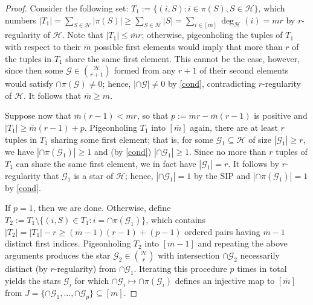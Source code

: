 \documentclass[journal, twocolumn]{IEEEtran}
\begin{document}
\begin{proof}
Consider the following set: $T_1 := \{(i, S): i \in \pi(S), S \in \mathcal{H}\}$, which numbers $|T_1| = \sum_{S \in \mathcal{H}} |\pi(S)| \geq \sum_{S \in \mathcal{H}} |S| = \sum_{i \in [m]} \deg_\mathcal{H}(i) = mr$ by $r$-regularity of $\mathcal{H}$. Note that $|T_1| \leq \overline m r$; otherwise, pigeonholing the tuples of $T_1$ with respect to their $\overline m$ possible first elements would imply that more than $r$ of the tuples in $T_1$ share the same first element. This cannot be the case, however, since then some $\mathcal{G} \in {\mathcal{H} \choose r+1}$ formed from any $r+1$ of their second elements would satisfy $\cap \pi(\mathcal{G}) \neq 0$; hence, $|\cap \mathcal{G}| \neq 0$ by \eqref{cond}, contradicting $r$-regularity of $\mathcal{H}$. It follows that $\overline m \geq m$.

Suppose now that $\overline m (r-1) < mr$, so that $p := mr - \overline m (r-1)$ is positive and $|T_1| \geq \overline m (r - 1) + p$. Pigeonholing $T_1$ into $[\overline m]$ again, there are at least $r$ tuples in $T_1$ sharing some first element; that is, for some $\mathcal{G}_1 \subseteq \mathcal{H}$ of size $|\mathcal{G}_1| \geq r$, we have $|\cap \pi(\mathcal{G}_1)| \geq 1$ and (by \eqref{cond}) $|\cap \mathcal{G}_1| \geq 1$. Since no more than $r$ tuples of $T_1$ can share the same first element, we in fact have $|\mathcal{G}_1| = r$. It follows by $r$-regularity that $\mathcal{G}_1$ is a star of $\mathcal{H}$; hence, $|\cap \mathcal{G}_1| = 1$ by the SIP and $|\cap \pi(\mathcal{G}_1)|  = 1$ by \eqref{cond}.

If $p=1$, then we are done. Otherwise, define $T_2 := T_1 \setminus \{(i,S) \in T_1: i = \cap \pi(\mathcal{G}_1)\}$, which contains $|T_2| = |T_1| - r \geq (\overline m - 1)(r-1) + (p-1)$ ordered pairs having $\overline m - 1$ distinct first indices. Pigeonholing $T_2$ into $[\overline m - 1]$ and repeating the above arguments produces the star $\mathcal{G}_2 \in {\mathcal{H} \choose r}$ with intersection $\cap \mathcal{G}_2$ necessarily distinct (by $r$-regularity) from $\cap \mathcal{G}_1$. Iterating this procedure $p$ times in total yields the stars $\mathcal{G}_i$ for which $\cap\mathcal{G}_i \mapsto \cap \pi(\mathcal{G}_i)$ defines an injective map to $[\overline m]$ from $J = \{\cap \mathcal{G}_1, \ldots, \cap \mathcal{G}_p\} \subseteq [m]$.
\end{proof}
\end{document}
